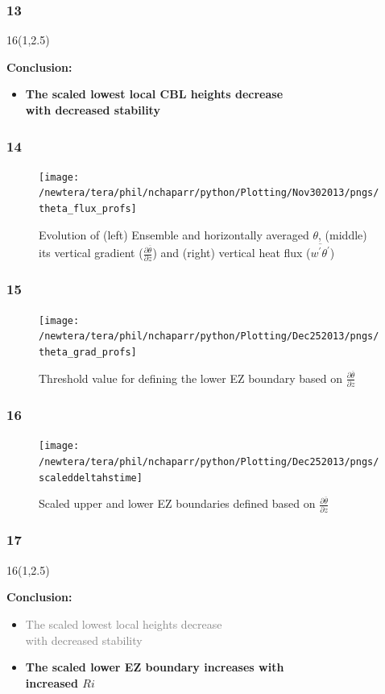 \documentclass{beamer}
\newcommand\FrameText[1]{
\begin{textblock}{16}(1,2.5)
\raggedright #1
\end{textblock}}
\begin{document}
\begin{frame}
\frametitle{13}
\FrameText{\bf{\large Conclusion:}
\vspace{5mm}
\begin{itemize}
\item \bf{\large The scaled lowest local CBL heights decrease\\
with decreased stability}
\end{itemize}
}
\end{frame}

\begin{frame}
\frametitle{14}
\fontsize{12pt}{7.2}\selectfont
\begin{figure}
\centering
\texttt{[image: /newtera/tera/phil/nchaparr/python/Plotting/Nov302013/pngs/theta\_flux\_profs]}
\caption{Evolution of (left) Ensemble and horizontally averaged $\theta$, (middle) its vertical gradient ($\frac{\partial \overline{\theta}}{\partial z}$) and (right) vertical heat flux ($\overline{w^{'}\theta^{'}}$)}
\caption{}
\end{figure}
\end{frame}

\begin{frame}
\frametitle{15}
\fontsize{12pt}{7.2}\selectfont
\begin{figure}
\centering
\texttt{[image: /newtera/tera/phil/nchaparr/python/Plotting/Dec252013/pngs/theta\_grad\_profs]}
\caption{Threshold value for defining the lower EZ boundary based on $\frac{\partial \overline{\theta}}{\partial z}$}
\end{figure}
\end{frame}

\begin{frame}
\frametitle{16}
\fontsize{12pt}{7.2}\selectfont
\begin{figure}
\centering
\texttt{[image: /newtera/tera/phil/nchaparr/python/Plotting/Dec252013/pngs/scaleddeltahstime]}
\caption{Scaled upper and lower EZ boundaries defined based on $\frac{\partial \overline{\theta}}{\partial z}$}
\end{figure}

\end{frame}

\begin{frame}
\frametitle{17}
\FrameText{\bf{\large Conclusion:}
\vspace{5mm}
\begin{itemize}
\item \textcolor{gray}{The scaled lowest local heights decrease\\
with decreased stability}
\vspace{5mm}
\item \bf{\large The scaled lower EZ boundary increases with\\
increased $Ri$}\\
\end{itemize}
}
\end{frame}
\end{document}

